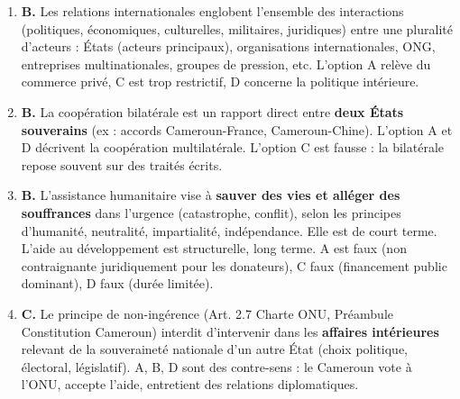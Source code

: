 \documentclass[11pt]{article}
\newcommand{\cle}[1]{{\popxbold\color{popdark}#1}}
\begin{document}
\begin{corrige}
\begin{enumerate}
    \item \textbf{B.} Les relations internationales englobent l'ensemble des interactions (politiques, économiques, culturelles, militaires, juridiques) entre une pluralité d'acteurs : États (acteurs principaux), organisations internationales, ONG, entreprises multinationales, groupes de pression, etc. L'option A relève du commerce privé, C est trop restrictif, D concerne la politique intérieure.
    \item \textbf{B.} La coopération \cle{bilatérale} est un rapport direct entre \textbf{deux États souverains} (ex : accords Cameroun-France, Cameroun-Chine). L'option A et D décrivent la coopération multilatérale. L'option C est fausse : la bilatérale repose souvent sur des traités écrits.
    \item \textbf{B.} L'\cle{assistance humanitaire} vise à \textbf{sauver des vies et alléger des souffrances} dans l'urgence (catastrophe, conflit), selon les principes d'humanité, neutralité, impartialité, indépendance. Elle est de court terme. L'aide au développement est structurelle, long terme. A est faux (non contraignante juridiquement pour les donateurs), C faux (financement public dominant), D faux (durée limitée).
    \item \textbf{C.} Le principe de \cle{non-ingérence} (Art. 2.7 Charte ONU, Préambule Constitution Cameroun) interdit d'intervenir dans les \textbf{affaires intérieures} relevant de la \cle{souveraineté} nationale d'un autre État (choix politique, électoral, législatif). A, B, D sont des contre-sens : le Cameroun vote à l'ONU, accepte l'aide, entretient des relations diplomatiques.
\end{enumerate}
\end{corrige}
\end{document}
